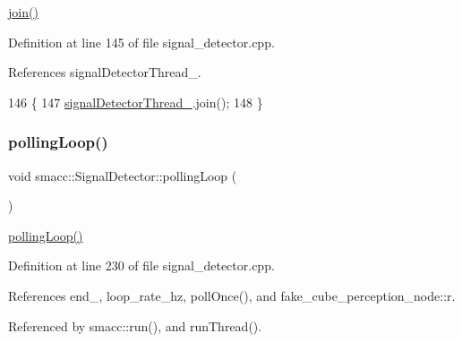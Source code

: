 \hyperlink{classsmacc_1_1SignalDetector_a636f704e469bf74b4a9fdb15bd63d5be}{join()} 

Definition at line 145 of file signal\+\_\+detector.\+cpp.



References signal\+Detector\+Thread\+\_\+.


\begin{DoxyCode}
146 \{
147     \hyperlink{classsmacc_1_1SignalDetector_a4346a400cd37eafc5d1d2e63d975785e}{signalDetectorThread\_}.join();
148 \}
\end{DoxyCode}
\mbox{\label{classsmacc_1_1SignalDetector_a2665e66cdae9f6533c64bbcecf3fa199}} 
\subsubsection{\texorpdfstring{polling\+Loop()}{pollingLoop()}}
{\footnotesize\ttfamily void smacc\+::\+Signal\+Detector\+::polling\+Loop (\begin{DoxyParamCaption}{ }\end{DoxyParamCaption})}

\hyperlink{classsmacc_1_1SignalDetector_a2665e66cdae9f6533c64bbcecf3fa199}{polling\+Loop()} 

Definition at line 230 of file signal\+\_\+detector.\+cpp.



References end\+\_\+, loop\+\_\+rate\+\_\+hz, poll\+Once(), and fake\+\_\+cube\+\_\+perception\+\_\+node\+::r.



Referenced by smacc\+::run(), and run\+Thread().


